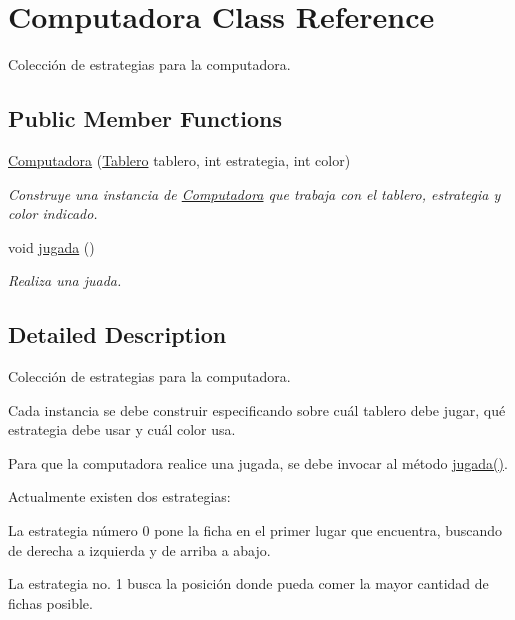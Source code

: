 \hypertarget{class_computadora}{}\section{Computadora Class Reference}
\label{class_computadora}


Colección de estrategias para la computadora.  


\subsection*{Public Member Functions}
\begin{DoxyCompactItemize}
\item 
\mbox{\hyperlink{class_computadora_ad4355373f2816ef2eb5d725283e632b4}{Computadora}} (\mbox{\hyperlink{class_tablero}{Tablero}} tablero, int estrategia, int color)
\begin{DoxyCompactList}\small\item\em Construye una instancia de \mbox{\hyperlink{class_computadora}{Computadora}} que trabaja con el tablero, estrategia y color indicado. \end{DoxyCompactList}\item 
void \mbox{\hyperlink{class_computadora_a935c14f6094fc48b44a3dc789892a522}{jugada}} ()
\begin{DoxyCompactList}\small\item\em Realiza una juada. \end{DoxyCompactList}\end{DoxyCompactItemize}


\subsection{Detailed Description}
Colección de estrategias para la computadora. 

Cada instancia se debe construir especificando sobre cuál tablero debe jugar, qué estrategia debe usar y cuál color usa.

Para que la computadora realice una jugada, se debe invocar al método \mbox{\hyperlink{class_computadora_a935c14f6094fc48b44a3dc789892a522}{jugada()}}.

Actualmente existen dos estrategias\+:
\begin{DoxyItemize}
\item La estrategia número 0 pone la ficha en el primer lugar que encuentra, buscando de derecha a izquierda y de arriba a abajo.
\item La estrategia no. 1 busca la posición donde pueda comer la mayor cantidad de fichas posible. 
\end{DoxyItemize}

